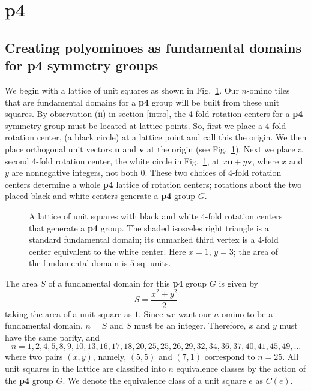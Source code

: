 \documentclass{ws-ijcga}
\begin{document}
\section{{\bf p4}}
\label{p4}
\subsection{Creating polyominoes as fundamental domains for {\bf p4} symmetry groups}
\label{p4:create}
We begin with a lattice of unit squares as shown in Fig.~\ref{fig:p4lattice}. 
Our $n$-omino tiles that are fundamental domains for a {\bf p4} group will be built from these unit squares. 
By observation (ii) in section \ref{intro}, 
the 4-fold rotation centers for a {\bf p4} symmetry group must be located at lattice points.
So, first we place a 4-fold rotation center, (a black circle) at a lattice point and call this the origin.
We then place orthogonal unit vectors $\mathbf u$ and $\mathbf v$ at the origin (see Fig.~\ref{fig:p4lattice}). 
Next we place a second
4-fold rotation center, the white circle in Fig.~\ref{fig:p4lattice}, at $x{\mathbf u} + y{\mathbf v}$, 
where $x$ and $y$ are nonnegative
integers, not both $0$. These two choices of 4-fold rotation centers determine a whole {\bf p4} lattice of
rotation centers; rotations about the two placed black and white centers generate a {\bf p4} group $G$.
\begin{figure}[h]
\centerline{}
\caption{
A lattice of unit squares with black and white 4-fold rotation centers that generate a {\bf p4} group. 
The shaded isosceles right triangle is a standard fundamental domain; 
its unmarked third vertex is a 4-fold center equivalent to
the white center. Here $x = 1$, $y = 3$; the area of the fundamental domain is $5$ sq. units.
\label{fig:p4lattice}
}
\end{figure}

The area $S$ of a fundamental domain for this {\bf p4} group $G$ is given by
\begin{equation}
S=\frac{x^2+y^2}{2}
\end{equation}
taking the area of a unit square as $1$. 
Since we want our $n$-omino to be a fundamental domain, $n = S$ and $S$ must be an integer. 
Therefore, $x$ and $y$ must have the same parity, and
\begin{equation}
n=1, 2, 4, 5, 8, 9, 10, 13, 16, 17, 18, 20, 25,	25,	26,	29,	32,	34,	36,	37,	40,	41,	45,	49,	
\ldots
\end{equation}
where two pairs $(x,y)$, namely, $(5,5)$ and $(7,1)$ correspond to $n = 25$.
All unit squares in the lattice
are classified into $n$ equivalence classes by the action of the {\bf p4} group $G$. 
We denote the equivalence class of a unit square $e$ as $C(e)$.
\end{document}
